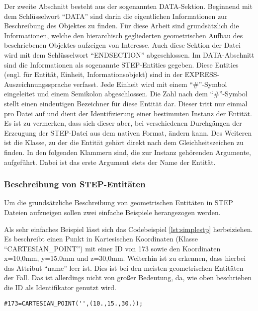 Der zweite Abschnitt besteht aus der sogenannten DATA-Sektion. Beginnend mit dem Schlüsselwort "`DATA"' sind darin die eigentlichen Informationen zur Beschreibung des Objektes zu finden. Für diese Arbeit sind grundsätzlich die Informationen, welche den hierarchisch gegliederten geometrischen Aufbau des beschriebenen Objektes aufzeigen von Interesse. Auch diese Sektion der Datei wird mit dem Schlüsselwort "`ENDSECTION"' abgeschlossen. Im DATA-Abschnitt sind die Informationen als sogenannte STEP-Entities gegeben. Diese Entities (engl. für Entität, Einheit, Informationsobjekt) sind in der EXPRESS-Auszeichnungssprache verfasst. Jede Einheit wird mit einem "`\#"'-Symbol eingeleitet und einem Semikolon abgeschlossen. Die Zahl nach dem "`\#"'-Symbol stellt einen eindeutigen Bezeichner für diese Entität dar. Dieser tritt nur einmal pro Datei auf und dient der Identifizierung einer bestimmten Instanz der Entität. Es ist zu vermerken, dass sich dieser aber, bei verschiedenen Durchgängen der Erzeugung der STEP-Datei aus dem nativen Format, ändern kann.
Des Weiteren ist die Klasse, zu der die Entität gehört direkt nach dem Gleichheitszeichen zu finden. In den folgenden Klammern sind, die zur Instanz gehörenden Argumente, aufgeführt. Dabei ist das erste Argument stets der Name der Entität. 

\subsubsection{Beschreibung von STEP-Entitäten}

Um die grundsätzliche Beschreibung von geometrischen Entitäten in STEP Dateien aufzueigen sollen zwei einfache Beispiele herangezogen werden.

Als sehr einfaches Beispiel lässt sich das Codebeispiel \ref{lst:simplestp} herbeiziehen. Es beschreibt einen Punkt in Kartesischen Koordinaten (Klasse "`CARTESIAN\_POINT"') mit einer ID von 173 sowie den Koordinaten x=10,0mm, y=15.0mm und z=30,0mm. Weiterhin ist zu erkennen, dass hierbei das Attribut "`name"' leer ist. Dies ist bei den meisten geometrischen Entitäten der Fall. Das ist allerdings nicht von großer Bedeutung, da, wie oben beschrieben die ID als Identifikator genutzt wird.    

\begin{lstlisting}[captionpos=b, style=customc, caption=Beschreibung eines Punktes in STEP, label=lst:simplestp]
#173=CARTESIAN_POINT('',(10.,15.,30.));
\end{lstlisting}


